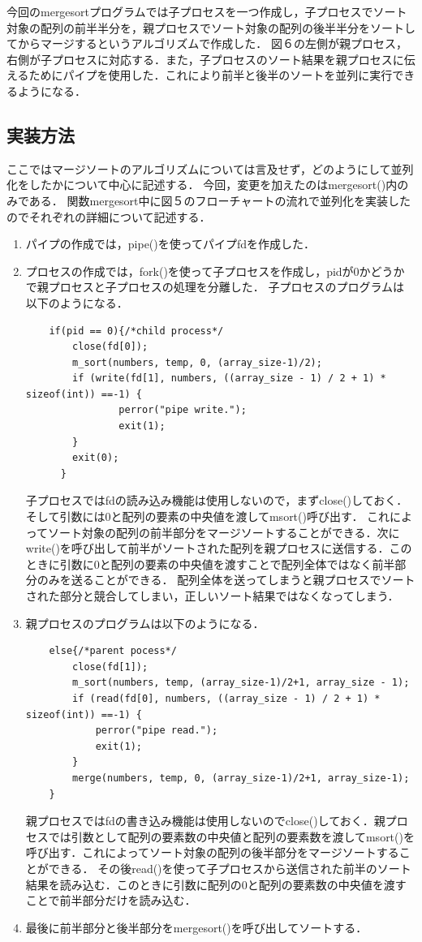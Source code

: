 \documentclass[dvipdfmx]{jarticle}
\begin{document}
今回のmergesortプログラムでは子プロセスを一つ作成し，子プロセスでソート対象の配列の前半半分を，親プロセスでソート対象の配列の後半半分をソートしてからマージするというアルゴリズムで作成した．
図６の左側が親プロセス，右側が子プロセスに対応する．また，子プロセスのソート結果を親プロセスに伝えるためにパイプを使用した．これにより前半と後半のソートを並列に実行できるようになる．
\subsection{実装方法}
ここではマージソートのアルゴリズムについては言及せず，どのようにして並列化をしたかについて中心に記述する．
今回，変更を加えたのはmergesort()内のみである．
関数mergesort中に図５のフローチャートの流れで並列化を実装したのでそれぞれの詳細について記述する．
\begin{enumerate}
    \item パイプの作成では，pipe()を使ってパイプfdを作成した．
    \item プロセスの作成では，fork()を使って子プロセスを作成し，pidが0かどうかで親プロセスと子プロセスの処理を分離した．
    子プロセスのプログラムは以下のようになる．
    \begin{lstlisting}
    if(pid == 0){/*child process*/
        close(fd[0]);
        m_sort(numbers, temp, 0, (array_size-1)/2);
        if (write(fd[1], numbers, ((array_size - 1) / 2 + 1) * sizeof(int)) ==-1) {
                perror("pipe write.");
                exit(1);
        }
        exit(0);
      }
    \end{lstlisting}
    子プロセスではfdの読み込み機能は使用しないので，まずclose()しておく．そして引数には0と配列の要素の中央値を渡してmsort()呼び出す．
    これによってソート対象の配列の前半部分をマージソートすることができる．次にwrite()を呼び出して前半がソートされた配列を親プロセスに送信する．このときに引数に0と配列の要素の中央値を渡すことで配列全体ではなく前半部分のみを送ることができる．
    配列全体を送ってしまうと親プロセスでソートされた部分と競合してしまい，正しいソート結果ではなくなってしまう．
    \item 親プロセスのプログラムは以下のようになる．
    \begin{lstlisting}
    else{/*parent pocess*/
        close(fd[1]);
        m_sort(numbers, temp, (array_size-1)/2+1, array_size - 1);
        if (read(fd[0], numbers, ((array_size - 1) / 2 + 1) * sizeof(int)) ==-1) {
            perror("pipe read.");
            exit(1);
        }
        merge(numbers, temp, 0, (array_size-1)/2+1, array_size-1);
    }
    \end{lstlisting}
    親プロセスではfdの書き込み機能は使用しないのでclose()しておく．親プロセスでは引数として配列の要素数の中央値と配列の要素数を渡してmsort()を呼び出す．これによってソート対象の配列の後半部分をマージソートすることができる．
    その後read()を使って子プロセスから送信された前半のソート結果を読み込む．このときに引数に配列の0と配列の要素数の中央値を渡すことで前半部分だけを読み込む．
    \item 最後に前半部分と後半部分をmergesort()を呼び出してソートする．
\end{enumerate}
\end{document}
